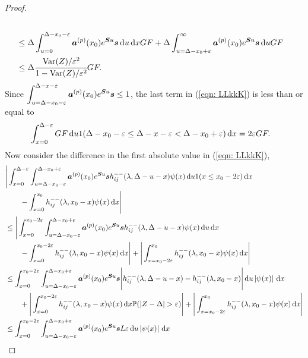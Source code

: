 \begin{proof}
\begin{align}
		\\&\leq\Delta\int_{u=0}^{\Delta-x_0-\varepsilon} \boldsymbol a^{(p)}(x_0)e^{\boldsymbol Su}\boldsymbol s  \, \mathrm{d} u \, \mathrm{d} xGF 
		+ \Delta \int_{u=\Delta-x_0+\varepsilon}^{\infty} \boldsymbol a^{(p)}(x_0)e^{\boldsymbol Su}\boldsymbol s  \, \mathrm{d} u GF \nonumber
		\\&\leq \Delta \cfrac{\mathrm{Var}(Z)/\varepsilon^2}{1-\mathrm{Var}(Z)/\varepsilon^2}GF. \label{eqn:aaAAAAd}
	\end{align}
	Since \(\displaystyle \int_{u=\Delta-x_0-\varepsilon}^{\Delta-x-\varepsilon} \boldsymbol a^{(p)}(x_0)e^{\boldsymbol Su}\boldsymbol s \leq 1\), the last term in (\ref{eqn: LLkkK}) is less than or equal to 
	\begin{align}
		&\int_{x=0}^{\Delta-\varepsilon}GF \, \mathrm{d} u 
		 1(\Delta-x_0-\varepsilon\leq \Delta - x -\varepsilon < \Delta-x_0+\varepsilon)\, \mathrm{d} x =2\varepsilon GF. \label{eqn:Qwe}
	\end{align}
	Now consider the difference in the first absolute value in (\ref{eqn: LLkkK}),
	\begin{align}
		&\Bigg|\int_{x=0}^{\Delta-\varepsilon}\int_{u=\Delta-x_0-\varepsilon}^{\Delta-x_0+\varepsilon} \bs a^{(p)}(x_0)e^{\bs Su}\bs s h_{ij}^{--}(\lambda, \Delta - u - x) \psi(x) \wrt u 1(x\leq x_0-2\varepsilon) \wrt x \nonumber
		\\&{}\qquad {} - \int_{x=0}^{x_0} h_{ij}^{--}(\lambda, x_0 - x)\psi(x)\wrt x \Bigg|\nonumber
		\\&\leq \Bigg|\int_{x=0}^{ x_0-2\varepsilon }\int_{u=\Delta-x_0-\varepsilon}^{\Delta-x_0+\varepsilon} \bs a^{(p)}(x_0)e^{\bs Su}\bs s h_{ij}^{--}(\lambda, \Delta - u - x) \psi(x) \wrt u  \wrt x \nonumber
		\\&{}\qquad {} - \int_{x=0}^{x_0-2\varepsilon} h_{ij}^{--}(\lambda, x_0 - x)\psi(x)\wrt x\Bigg| + \Bigg| \int_{x=x_0-2\varepsilon}^{x_0} h_{ij}^{--}(\lambda, x_0 - x)\psi(x)\wrt x\Bigg| \nonumber
		\\&\leq  \int_{x=0}^{ x_0-2\varepsilon }\int_{u=\Delta-x_0-\varepsilon}^{\Delta-x_0+\varepsilon} \bs a^{(p)}(x_0)e^{\bs Su}\bs s \Bigg| h_{ij}^{--}(\lambda, \Delta - u - x) - h_{ij}^{--}(\lambda, x_0 - x) \Bigg| \wrt u \left|\psi(x)\right| \wrt x  \nonumber
		\\&{}\qquad {} + \Bigg| \int_{x=0}^{x_0-2\varepsilon} h_{ij}^{--}(\lambda, x_0 - x)\psi(x) \wrt x \mathbb P(|Z-\Delta|>\varepsilon)\Bigg| + \Bigg|\int_{x=x_0-2\varepsilon}^{x_0} h_{ij}^{--}(\lambda, x_0 - x)\psi(x)\wrt x \Bigg| \nonumber
		\\&\leq \int_{x=0}^{ x_0-2\varepsilon }\int_{u=\Delta-x_0-\varepsilon}^{\Delta-x_0+\varepsilon} \bs a^{(p)}(x_0)e^{\bs Su}\bs s L\varepsilon  \wrt u \left|\psi(x)\right| \wrt x \nonumber

\end{align}
\end{proof}
